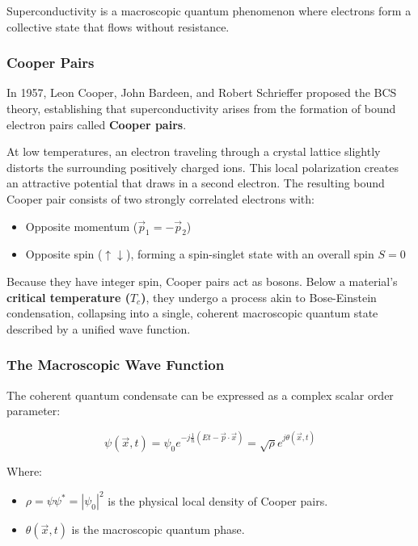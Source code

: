 \documentclass[
]{article}
\providecommand{\tightlist}{%
  \setlength{\itemsep}{0pt}\setlength{\parskip}{0pt}}
\begin{document}
Superconductivity is a macroscopic quantum phenomenon where electrons
form a collective state that flows without resistance.

\subsubsection{Cooper Pairs}\label{cooper-pairs}

In 1957, Leon Cooper, John Bardeen, and Robert Schrieffer proposed the
BCS theory, establishing that superconductivity arises from the
formation of bound electron pairs called \textbf{Cooper pairs}.

At low temperatures, an electron traveling through a crystal lattice
slightly distorts the surrounding positively charged ions. This local
polarization creates an attractive potential that draws in a second
electron. The resulting bound Cooper pair consists of two strongly
correlated electrons with:

\begin{itemize}
\tightlist
\item
  Opposite momentum (\(\vec{p}_1 = -\vec{p}_2\))
\item
  Opposite spin (\(\uparrow\downarrow\)), forming a spin-singlet state
  with an overall spin \(S=0\)
\end{itemize}

Because they have integer spin, Cooper pairs act as bosons. Below a
material's \textbf{critical temperature (\(T_c\))}, they undergo a
process akin to Bose-Einstein condensation, collapsing into a single,
coherent macroscopic quantum state described by a unified wave function.

\subsubsection{The Macroscopic Wave
Function}\label{the-macroscopic-wave-function}

The coherent quantum condensate can be expressed as a complex scalar
order parameter:

\[\psi(\vec{x}, t) = \psi_0 e^{-j\frac{1}{\hbar}(Et - \vec{p}\cdot\vec{x})} = \sqrt{\rho} e^{j\theta(\vec{x}, t)}\]

Where:

\begin{itemize}
\tightlist
\item
  \(\rho = \psi\psi^* = |\psi_0|^2\) is the physical local density of
  Cooper pairs.
\item
  \(\theta(\vec{x}, t)\) is the macroscopic quantum phase.
\end{itemize}
\end{document}
